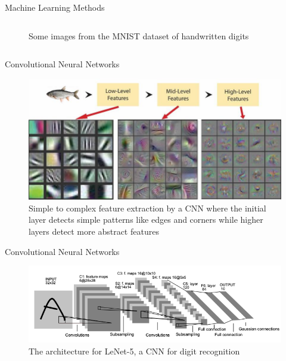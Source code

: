 \documentclass{beamer}
\begin{document}
\begin{frame}{Machine Learning Methods}
\begin{columns}
\begin{column}{0.5\textwidth}
\begin{figure}
        \caption{Some images from the MNIST dataset of handwritten digits}
        \label{fig:mnist}
    \end{figure}
    \end{column}
    \end{columns}
\end{frame}

\begin{frame}{Convolutional Neural Networks}
    \begin{figure}
        \centering
        \includegraphics[width=\textwidth]{Figures/CNNfMap.png}
        \caption{Simple to complex feature extraction by a CNN where the initial layer detects simple patterns like edges and corners while higher layers detect more abstract features}
        \label{fig:cnnfmap}
    \end{figure}
    
\end{frame}

\begin{frame}{Convolutional Neural Networks}
    \begin{figure}
        \centering
        \includegraphics[width=\textwidth]{Figures/LeNet-5.png}
        \caption{The architecture for LeNet-5, a CNN for digit recognition}
        \label{fig:lenet5}
    \end{figure}
    
\end{frame}
\end{document}
